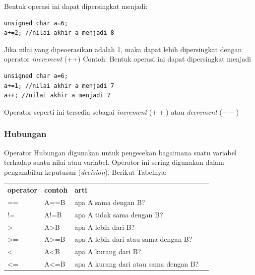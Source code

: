\documentclass[12pt,]{article}
\begin{document}
	Bentuk operasi ini dapat dipersingkat menjadi:
	\begin{verbatim}
unsigned char a=6;
a+=2; //nilai akhir a menjadi 8
	\end{verbatim}
	
	Jika nilai yang dipeoerasikan adalah 1, maka dapat lebih dipersingkat dengan operator \textit{increment} (++)
	Contoh:
	Bentuk operasi ini dapat dipersingkat menjadi
	\begin{verbatim}
unsigned char a=6;
a+=1; //nilai akhir a menjadi 7
a++; //nilai akhir a menjadi 7
	\end{verbatim}
	
	Operator seperti ini tersedia sebagai \textit{increment} ($++$) atau \textit{decrement} ($--$)
	
	\subsubsection{Hubungan}
	
	Operator Hubungan digunakan untuk pengecekan bagaimana suatu variabel terhadap suatu nilai atau variabel.
	Operator ini sering digunakan dalam pengambilan keputusan (\textit{decision}).
	Berikut Tabelnya:
	\begin{table}[H]
		\begin{tabular}{|l|l|l|l}
			\cline{1-3}
			\textbf{operator} & \textbf{contoh} & \textbf{arti} \\ \cline{1-3}
			==                & A==B            & apa A sama dengan B? \\ \cline{1-3}
			!=                & A!=B            & apa A tidak sama dengan B? \\ \cline{1-3}
			>                 & A>B             & apa A lebih dari B?  \\ \cline{1-3}
			>=                & A>=B            & apa A lebih dari atau sama dengan B?\\ \cline{1-3}
			<                 & A<B             & apa A kurang dari B? \\ \cline{1-3}
			<=                & A<=B            & apa A kurang dari atau sama dengan B? \\ \cline{1-3}
		\end{tabular}
	\end{table}
\end{document}
